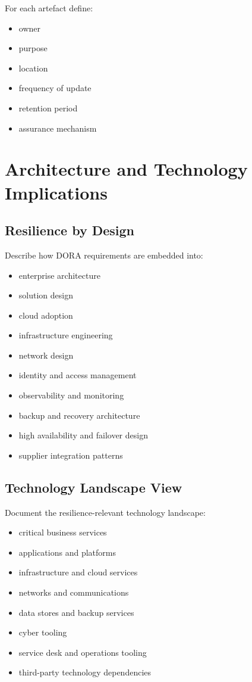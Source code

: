 \documentclass[
  letterpaper,
  DIV=11,
  numbers=noendperiod]{scrartcl}
\providecommand{\tightlist}{%
  \setlength{\itemsep}{0pt}\setlength{\parskip}{0pt}}
\begin{document}
For each artefact define:

\begin{itemize}
\tightlist
\item
  owner
\item
  purpose
\item
  location
\item
  frequency of update
\item
  retention period
\item
  assurance mechanism
\end{itemize}

\section{Architecture and Technology
Implications}\label{architecture-and-technology-implications}

\subsection{Resilience by Design}\label{resilience-by-design}

Describe how DORA requirements are embedded into:

\begin{itemize}
\tightlist
\item
  enterprise architecture
\item
  solution design
\item
  cloud adoption
\item
  infrastructure engineering
\item
  network design
\item
  identity and access management
\item
  observability and monitoring
\item
  backup and recovery architecture
\item
  high availability and failover design
\item
  supplier integration patterns
\end{itemize}

\subsection{Technology Landscape View}\label{technology-landscape-view}

Document the resilience-relevant technology landscape:

\begin{itemize}
\tightlist
\item
  critical business services
\item
  applications and platforms
\item
  infrastructure and cloud services
\item
  networks and communications
\item
  data stores and backup services
\item
  cyber tooling
\item
  service desk and operations tooling
\item
  third-party technology dependencies
\end{itemize}
\end{document}
